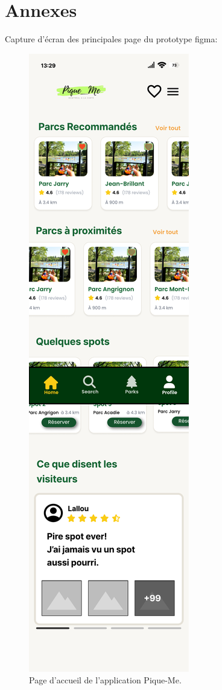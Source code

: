 \documentclass[12pt,a4paper]{article}
\begin{document}
\clearpage
\appendix
\section{Annexes}

Capture d'écran des principales page du prototype figma:

\begin{figure}[h!]
  \centering
  \includegraphics[width=0.9\linewidth]{attachments/HomeConnected.pdf}
  \caption{Page d'accueil de l'application Pique-Me.}
\end{figure}
\end{document}
